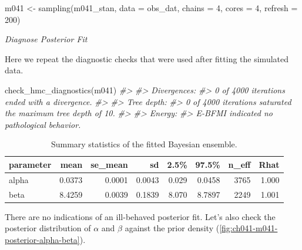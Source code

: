\documentclass[11pt, oneside, openany]{scrbook}
\newenvironment{Shaded}{\begin{snugshade}}{\end{snugshade}}
\newcommand{\AttributeTok}[1]{\textcolor[rgb]{0.77,0.63,0.00}{#1}}
\newcommand{\CommentTok}[1]{\textcolor[rgb]{0.56,0.35,0.01}{\textit{#1}}}
\newcommand{\DecValTok}[1]{\textcolor[rgb]{0.00,0.00,0.81}{#1}}
\newcommand{\FunctionTok}[1]{\textcolor[rgb]{0.00,0.00,0.00}{#1}}
\newcommand{\NormalTok}[1]{#1}
\newcommand{\OtherTok}[1]{\textcolor[rgb]{0.56,0.35,0.01}{#1}}
\begin{document}

\begin{Shaded}
\begin{Highlighting}[]
\NormalTok{m041 }\OtherTok{\textless{}{-}} \FunctionTok{sampling}\NormalTok{(m041\_stan, }\AttributeTok{data =}\NormalTok{ obs\_dat, }
                 \AttributeTok{chains =} \DecValTok{4}\NormalTok{, }\AttributeTok{cores =} \DecValTok{4}\NormalTok{, }\AttributeTok{refresh =} \DecValTok{200}\NormalTok{)}
\end{Highlighting}
\end{Shaded}


\emph{Diagnose Posterior Fit}

Here we repeat the diagnostic checks that were used after fitting the simulated data.


\begin{Shaded}
\begin{Highlighting}[]
\FunctionTok{check\_hmc\_diagnostics}\NormalTok{(m041)}
\CommentTok{\#\textgreater{} }
\CommentTok{\#\textgreater{} Divergences:}
\CommentTok{\#\textgreater{} 0 of 4000 iterations ended with a divergence.}
\CommentTok{\#\textgreater{} }
\CommentTok{\#\textgreater{} Tree depth:}
\CommentTok{\#\textgreater{} 0 of 4000 iterations saturated the maximum tree depth of 10.}
\CommentTok{\#\textgreater{} }
\CommentTok{\#\textgreater{} Energy:}
\CommentTok{\#\textgreater{} E{-}BFMI indicated no pathological behavior.}
\end{Highlighting}
\end{Shaded}


\begin{table}[!h]

\caption{\label{tab:ch041-Maroon-Oyster}Summary statistics of the fitted Bayesian ensemble.}
\centering
\begin{tabular}[t]{lrrrrrrr}
\toprule
parameter & mean & se\_mean & sd & 2.5\% & 97.5\% & n\_eff & Rhat\\
\midrule
alpha & 0.0373 & 0.0001 & 0.0043 & 0.029 & 0.0458 & 3765 & 1.000\\
beta & 8.4259 & 0.0039 & 0.1839 & 8.070 & 8.7897 & 2249 & 1.001\\
\bottomrule
\end{tabular}
\end{table}

There are no indications of an ill-behaved posterior fit. Let's also check the posterior distribution of \(\alpha\) and \(\beta\) against the prior density (\ref{fig:ch041-m041-posterior-alpha-beta}).
\end{document}
